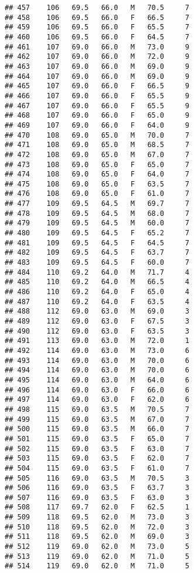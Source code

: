 \documentclass[
]{article}
\begin{document}
\begin{verbatim}
## 457    106   69.5   66.0   M   70.5     7
## 458    106   69.5   66.0   F   66.5     7
## 459    106   69.5   66.0   F   65.5     7
## 460    106   69.5   66.0   F   64.5     7
## 461    107   69.0   66.0   M   73.0     9
## 462    107   69.0   66.0   M   72.0     9
## 463    107   69.0   66.0   M   69.0     9
## 464    107   69.0   66.0   M   69.0     9
## 465    107   69.0   66.0   F   66.5     9
## 466    107   69.0   66.0   F   65.5     9
## 467    107   69.0   66.0   F   65.5     9
## 468    107   69.0   66.0   F   65.0     9
## 469    107   69.0   66.0   F   64.0     9
## 470    108   69.0   65.0   M   70.0     7
## 471    108   69.0   65.0   M   68.5     7
## 472    108   69.0   65.0   M   67.0     7
## 473    108   69.0   65.0   F   65.0     7
## 474    108   69.0   65.0   F   64.0     7
## 475    108   69.0   65.0   F   63.5     7
## 476    108   69.0   65.0   F   61.0     7
## 477    109   69.5   64.5   M   69.7     7
## 478    109   69.5   64.5   M   68.0     7
## 479    109   69.5   64.5   M   60.0     7
## 480    109   69.5   64.5   F   65.2     7
## 481    109   69.5   64.5   F   64.5     7
## 482    109   69.5   64.5   F   63.7     7
## 483    109   69.5   64.5   F   60.0     7
## 484    110   69.2   64.0   M   71.7     4
## 485    110   69.2   64.0   M   66.5     4
## 486    110   69.2   64.0   F   65.0     4
## 487    110   69.2   64.0   F   63.5     4
## 488    112   69.0   63.0   M   69.0     3
## 489    112   69.0   63.0   F   67.5     3
## 490    112   69.0   63.0   F   63.5     3
## 491    113   69.0   63.0   M   72.0     1
## 492    114   69.0   63.0   M   73.0     6
## 493    114   69.0   63.0   M   70.0     6
## 494    114   69.0   63.0   M   70.0     6
## 495    114   69.0   63.0   M   64.0     6
## 496    114   69.0   63.0   F   66.0     6
## 497    114   69.0   63.0   F   62.0     6
## 498    115   69.0   63.5   M   70.5     7
## 499    115   69.0   63.5   M   67.0     7
## 500    115   69.0   63.5   M   66.0     7
## 501    115   69.0   63.5   F   65.0     7
## 502    115   69.0   63.5   F   63.0     7
## 503    115   69.0   63.5   F   62.0     7
## 504    115   69.0   63.5   F   61.0     7
## 505    116   69.0   63.5   M   70.5     3
## 506    116   69.0   63.5   F   63.7     3
## 507    116   69.0   63.5   F   63.0     3
## 508    117   69.7   62.0   F   62.5     1
## 509    118   69.5   62.0   M   73.0     3
## 510    118   69.5   62.0   M   72.0     3
## 511    118   69.5   62.0   M   69.0     3
## 512    119   69.0   62.0   M   73.0     5
## 513    119   69.0   62.0   M   71.0     5
## 514    119   69.0   62.0   M   71.0     5

\end{verbatim}
\end{document}
